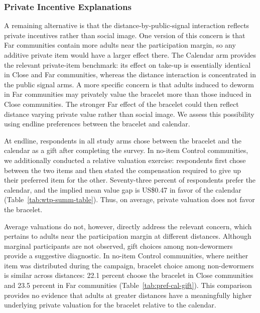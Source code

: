 \documentclass[ECM\space ReStud.tex]{subfiles}
\begin{document}
\subsubsection{Private Incentive Explanations}\label{subsec:consumption}

A remaining alternative is that the distance-by-public-signal interaction reflects private incentives rather than social image. One version of this concern is that Far communities contain more adults near the participation margin, so any additive private item would have a larger effect there. The Calendar arm provides the relevant private-item benchmark: its effect on take-up is essentially identical in Close and Far communities, whereas the distance interaction is concentrated in the public signal arms. A more specific concern is that adults induced to deworm in Far communities may privately value the bracelet more than those induced in Close communities. The stronger Far effect of the bracelet could then reflect distance varying private value rather than social image. We assess this possibility using endline preferences between the bracelet and calendar.

At endline, respondents in all study arms chose between the bracelet and the calendar as a gift after completing the survey. In no-item Control communities, we additionally conducted a relative valuation exercise: respondents first chose between the two items and then stated the compensation required to give up their preferred item for the other. Seventy-three percent of respondents prefer the calendar, and the implied mean value gap is US\$0.47 in favor of the calendar (Table~\ref{tab:wtp-summ-table}). Thus, on average, private valuation does not favor the bracelet.

Average valuations do not, however, directly address the relevant concern, which pertains to adults near the participation margin at different distances. Although marginal participants are not observed, gift choices among non-dewormers provide a suggestive diagnostic. In no-item Control communities, where neither item was distributed during the campaign, bracelet choice among non-dewormers is similar across distances: 22.1 percent choose the bracelet in Close communities and 23.5 percent in Far communities (Table~\ref{tab:pref-cal-gift}). This comparison provides no evidence that adults at greater distances have a meaningfully higher underlying private valuation for the bracelet relative to the calendar.
\end{document}
